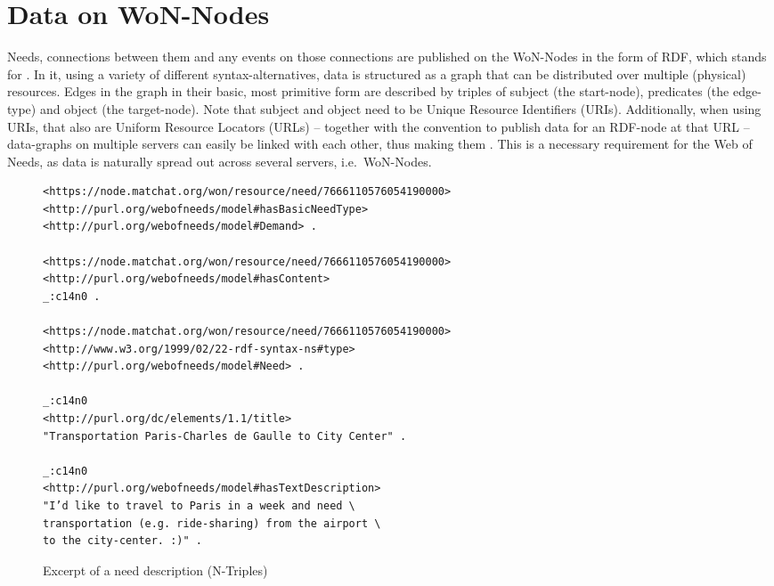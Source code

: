 
\section{Data on WoN-Nodes}\label{data-on-won-nodes}

Needs, connections between them and any events on those connections are
published on the WoN-Nodes in the form of RDF, which stands for
. In it, using a variety of different
syntax-alternatives, data is structured as a graph that can be
distributed over multiple (physical) resources. Edges in the graph in
their basic, most primitive form are described by triples of subject
(the start-node), predicates (the edge-type) and object (the
target-node). Note that subject and object need to be Unique Resource
Identifiers (URIs). Additionally, when using URIs, that also are Uniform
Resource Locators (URLs) -- together with the convention to publish data
for an RDF-node at that URL -- data-graphs on multiple servers can
easily be linked with each other, thus making them
. This is a
necessary requirement for the Web of Needs, as data is naturally spread
out across several servers, i.e.~WoN-Nodes.

\begin{figure*}
\centering
\begin{verbatim}
<https://node.matchat.org/won/resource/need/7666110576054190000>
<http://purl.org/webofneeds/model#hasBasicNeedType>
<http://purl.org/webofneeds/model#Demand> .

<https://node.matchat.org/won/resource/need/7666110576054190000>
<http://purl.org/webofneeds/model#hasContent>
_:c14n0 .

<https://node.matchat.org/won/resource/need/7666110576054190000>
<http://www.w3.org/1999/02/22-rdf-syntax-ns#type>
<http://purl.org/webofneeds/model#Need> .

_:c14n0
<http://purl.org/dc/elements/1.1/title>
"Transportation Paris-Charles de Gaulle to City Center" .

_:c14n0
<http://purl.org/webofneeds/model#hasTextDescription>
"I’d like to travel to Paris in a week and need \
transportation (e.g. ride-sharing) from the airport \
to the city-center. :)" .
\end{verbatim}
\caption{Excerpt of a need description (N-Triples)}
\label{fig:needtriples}
\end{figure*}

